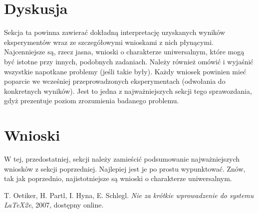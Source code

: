 \documentclass{classrep}
\begin{document}
\section{Dyskusja}
{
Sekcja ta powinna zawierać dokładną interpretację uzyskanych wyników
eksperymentów wraz ze szczegółowymi wnioskami z nich płynącymi. Najcenniejsze
są, rzecz jasna, wnioski o charakterze uniwersalnym, które mogą być istotne
przy innych, podobnych zadaniach. Należy również omówić i wyjaśnić wszystkie
napotkane problemy (jeśli takie były). Każdy wniosek powinien mieć poparcie we
wcześniej przeprowadzonych eksperymentach (odwołania do konkretnych wyników).
Jest to jedna z najważniejszych sekcji tego sprawozdania, gdyż prezentuje
poziom zrozumienia badanego problemu.}

\section{Wnioski}
{
W tej, przedostatniej, sekcji należy zamieścić podsumowanie najważniejszych
wniosków z sekcji poprzedniej. Najlepiej jest je po prostu wypunktować. Znów,
tak jak poprzednio, najistotniejsze są wnioski o charakterze uniwersalnym.}

\begin{thebibliography}{0}
   T. Oetiker, H. Partl, I. Hyna, E. Schlegl.
    \textsl{Nie za krótkie wprowadzenie do systemu \LaTeX2e}, 2007, dostępny
    online.
\end{thebibliography}
\end{document}
